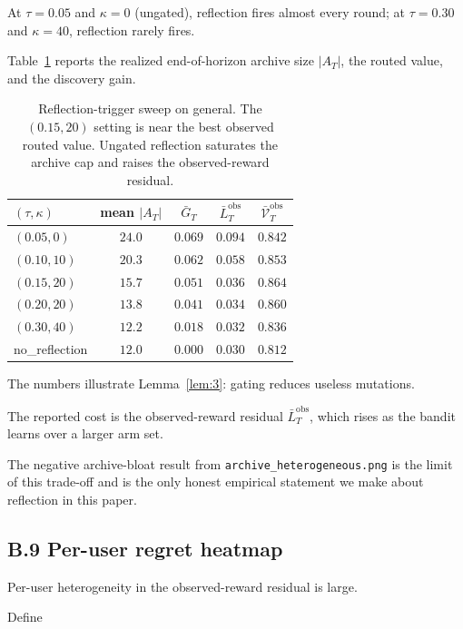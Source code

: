 \documentclass{article} %
\begin{document}
At $\tau=0.05$ and $\kappa=0$ (ungated), reflection fires almost every round; at $\tau=0.30$ and $\kappa=40$, reflection rarely fires.

Table~\ref{tab:app-reflection-sweep} reports the realized end-of-horizon archive size $|A_T|$, the routed value, and the discovery gain.

\begin{table}[h]
\centering
\small
\begin{tabular}{lcccc}
\toprule
$(\tau,\kappa)$ & mean $|A_T|$ & $\bar G_T$ & $\bar L_T^{\mathrm{obs}}$ & $\bar{\mathcal V}_T^{\mathrm{obs}}$ \\
\midrule
$(0.05,0)$    & $24.0$ & $0.069$ & $0.094$ & $0.842$ \\
$(0.10,10)$   & $20.3$ & $0.062$ & $0.058$ & $0.853$ \\
$(0.15,20)$   & $15.7$ & $0.051$ & $0.036$ & $0.864$ \\
$(0.20,20)$   & $13.8$ & $0.041$ & $0.034$ & $0.860$ \\
$(0.30,40)$   & $12.2$ & $0.018$ & $0.032$ & $0.836$ \\
no\_reflection& $12.0$ & $0.000$ & $0.030$ & $0.812$ \\
\bottomrule
\end{tabular}
\caption{Reflection-trigger sweep on general. The \((0.15,20)\) setting is
near the best observed routed value. Ungated reflection saturates the archive
cap and raises the observed-reward residual.}
\label{tab:app-reflection-sweep}
\end{table}

The numbers illustrate Lemma~\ref{lem:3}: gating reduces useless mutations.

The reported cost is the observed-reward residual
\(\bar L_T^{\mathrm{obs}}\), which rises as the bandit learns over a larger arm
set.

The negative archive-bloat result from \texttt{archive\_heterogeneous.png} is the limit of this trade-off and is the only honest empirical statement we make about reflection in this paper.

\subsection{B.9 Per-user regret heatmap}

\label{app:per-user-regret}

Per-user heterogeneity in the observed-reward residual is large.

Define
\end{document}
